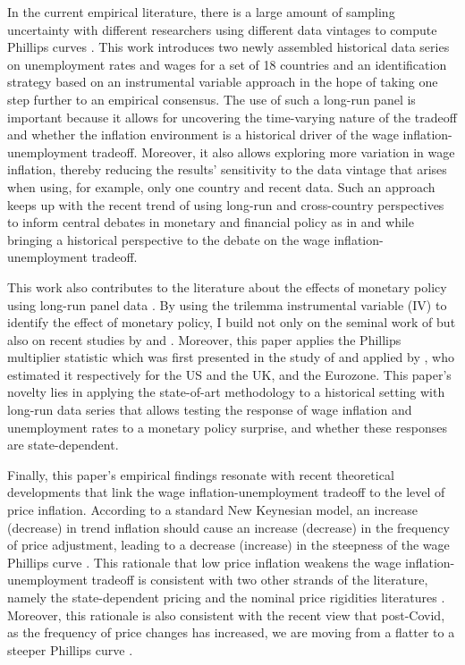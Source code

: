 \documentclass[12pt]{article}
\begin{document}
In the current empirical literature, there is a large amount of sampling uncertainty with different researchers using different data vintages to compute Phillips curves \citep{Mavroeidis2014}. This work introduces two newly assembled historical data series on unemployment rates and wages for a set of 18 countries and an identification strategy based on an instrumental variable approach in the hope of taking one step further to an empirical consensus. The use of such a long-run panel is important because it allows for uncovering the time-varying nature of the tradeoff and whether the inflation environment is a historical driver of the wage inflation-unemployment tradeoff. Moreover, it also allows exploring more variation in wage inflation, thereby reducing the results' sensitivity to the data vintage that arises when using, for example, only one country and recent data. Such an approach keeps up with the recent trend of using long-run and cross-country perspectives to inform central debates in monetary and financial policy as in \cite{Reinhart2009} and \cite{Schularick2012} while bringing a historical perspective to the debate on the wage inflation-unemployment tradeoff.

This work also contributes to the literature about the effects of monetary policy using long-run panel data \citep{Alpanda2019, Jorda2019}. By using the trilemma instrumental variable (IV) to identify the effect of monetary policy, I build not only on the seminal work of \cite{DiGiovanni2009} but also on recent studies by \cite{Jorda2019} and \cite{Schularick2020}. Moreover, this paper applies the Phillips multiplier statistic which was first presented in the study of \cite{Barnichon2019} and applied by \cite{Eser2020}, who estimated it respectively for the US and the UK, and the Eurozone. This paper's novelty lies in applying the state-of-art methodology to a historical setting with long-run data series that allows testing the response of wage inflation and unemployment rates to a monetary policy surprise, and whether these responses are state-dependent.

Finally, this paper's empirical findings resonate with recent theoretical developments that link the wage inflation-unemployment tradeoff to the level of price inflation. According to a standard New Keynesian model, an increase (decrease) in trend inflation should cause an increase (decrease) in the frequency of price adjustment, leading to a decrease (increase) in the steepness of the wage Phillips curve \citep{Benati2007}. This rationale that low price inflation weakens the wage inflation-unemployment tradeoff is consistent with two other strands of the literature, namely the state-dependent pricing \citep{Alvarez2019, Costain2022} and the nominal price rigidities literatures \citep{Tobin1972, Benigno2011, Daly2014}. Moreover, this rationale is also consistent with the recent view that post-Covid, as the frequency of price changes has increased, we are moving from a flatter to a steeper Phillips curve \citep{Waller2023}.
\end{document}
